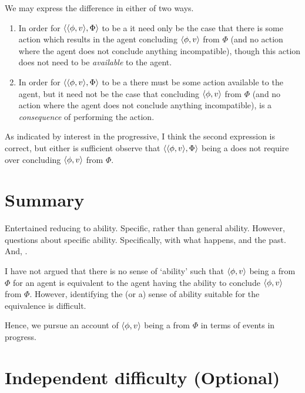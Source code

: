 \begin{note}
  We may express the difference in either of two ways.
  \begin{enumerate}[label=\arabic*.]
  \item
    In order for \(\langle \langle \phi, v \rangle, \Phi \rangle\) to be a \fc{} it need only be the case that there is some action which results in the agent concluding \(\langle\phi, v\rangle\) from \(\Phi\) (and no action where the agent does not conclude anything incompatible), though this action does not need to be \emph{available} to the agent.
  \item
    In order for \(\langle \langle \phi, v \rangle, \Phi \rangle\) to be a \fc{} there must be some action available to the agent, but it need not be the case that concluding \(\langle\phi, v\rangle\) from \(\Phi\) (and no action where the agent does not conclude anything incompatible), is a \emph{consequence} of performing the action.
  \end{enumerate}
  As indicated by interest in the progressive, I think the second expression is correct, but either is sufficient observe that \(\langle \langle \phi, v \rangle, \Phi \rangle\) being a \fc{} does not require \AbControl{} over concluding \(\langle\phi, v\rangle\) from \(\Phi\).
\end{note}

\section{Summary}

\begin{note}
  Entertained reducing  to ability.
  Specific, rather than general ability.
  However, questions about specific ability.
  Specifically, with what happens, and the past.
  And, \AbControl{}.
\end{note}

\begin{note}
  I have not argued that there is no sense of `ability' such that \(\langle\phi, v\rangle\) being a  from \(\Phi\) for an agent is equivalent to the agent having the ability to conclude \(\langle\phi, v\rangle\) from \(\Phi\).
  However, identifying the (or a) sense of ability suitable for the equivalence is difficult.

  Hence, we pursue an account of \(\langle\phi, v\rangle\) being a  from \(\Phi\) in terms of events in progress.
\end{note}

\section[Independent difficulty]{Independent difficulty \hfill (Optional)}

